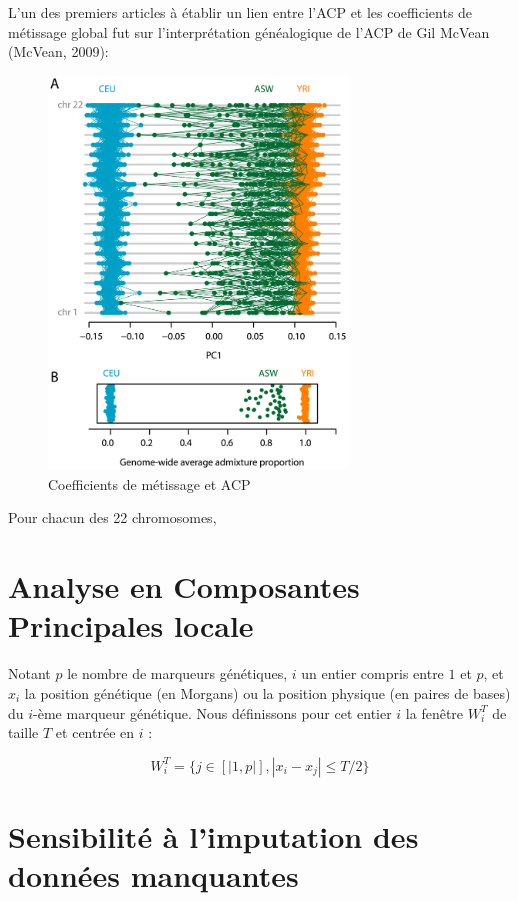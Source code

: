 \documentclass[12pt,twoside]{ugathesis}
\begin{document}
  L'un des premiers articles à établir un lien entre l'ACP et les
  coefficients de métissage global fut sur l'interprétation généalogique
  de l'ACP de Gil McVean (McVean, 2009):
  \begin{figure}
  
  {\centering \includegraphics[width=300px]{figure/mcvean} 
  
  }
  
  \caption{Coefficients de métissage et ACP}\label{fig:mcvean}
  \end{figure}
  Pour chacun des 22 chromosomes,
  
  \section{Analyse en Composantes Principales
  locale}\label{analyse-en-composantes-principales-locale}
  
  Notant \(p\) le nombre de marqueurs génétiques, \(i\) un entier compris
  entre \(1\) et \(p\), et \(x_i\) la position génétique (en Morgans) ou
  la position physique (en paires de bases) du \(i\)-ème marqueur
  génétique. Nous définissons pour cet entier \(i\) la fenêtre \(W_i^T\)
  de taille \(T\) et centrée en \(i\) :
  
  \[W_i^T = \{ j \in [|1, p|], |x_i - x_j| \leq T/2 \}\]
  
  \section{Sensibilité à l'imputation des données
  manquantes}\label{sensibilite-a-limputation-des-donnees-manquantes}
  
\end{document}
